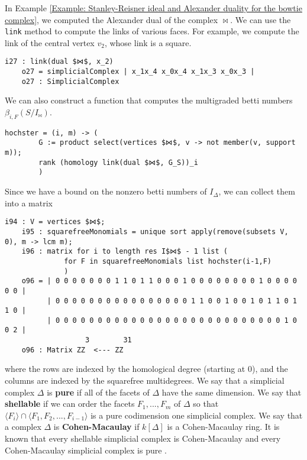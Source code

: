 \documentclass[12pt,leqno]{amsart}
\theoremstyle{definition}
\newenvironment{example}
{\pushQED{\qed}\renewcommand{\qedsymbol}{$\diamond$}\examplex}
{\popQED\endexamplex}
\begin{document}
\begin{example}
  In Example \ref{Example: Stanley-Reisner ideal and Alexander duality for the bowtie complex}, we computed the Alexander dual of the complex $\bowtie$. We can use the \texttt{link} method to compute the links of various faces. For example, we compute the link of the central vertex $v_2$, whose link is a square.
\begin{lstlisting}[basicstyle={\ttfamily \scriptsize}, xleftmargin=-23pt]
    i27 : link(dual $⋈$, x_2)
    o27 = simplicialComplex | x_1x_4 x_0x_4 x_1x_3 x_0x_3 |
    o27 : SimplicialComplex
\end{lstlisting}
  We can also construct a function that computes the multigraded betti numbers $\beta_{i,F}(S/I_{\bowtie})$.
\begin{lstlisting}[basicstyle={\ttfamily \scriptsize}, xleftmargin=-23pt]
    hochster = (i, m) -> (
        G := product select(vertices $⋈$, v -> not member(v, support m));
        rank (homology link(dual $⋈$, G_S))_i
        )
\end{lstlisting}
  Since we have a bound on the nonzero betti numbers of $I_\Delta$, we can collect them into a matrix
\begin{lstlisting}[basicstyle={\ttfamily \scriptsize}, xleftmargin=-23pt]
    i94 : V = vertices $⋈$;
    i95 : squarefreeMonomials = unique sort apply(remove(subsets V, 0), m -> lcm m);
    i96 : matrix for i to length res I$⋈$ - 1 list (
              for F in squarefreeMonomials list hochster(i-1,F)
              )
    o96 = | 0 0 0 0 0 0 0 1 1 0 1 1 0 0 0 1 0 0 0 0 0 0 0 0 1 0 0 0 0 0 0 |
          | 0 0 0 0 0 0 0 0 0 0 0 0 0 0 0 0 1 1 0 0 1 0 0 1 0 1 1 0 1 1 0 |
          | 0 0 0 0 0 0 0 0 0 0 0 0 0 0 0 0 0 0 0 0 0 0 0 0 0 0 0 1 0 0 2 |
                   3        31
    o96 : Matrix ZZ  <--- ZZ
\end{lstlisting}
  where the rows are indexed by the homological degree (starting at $0$), and the columns are indexed by the squarefree multidegrees.
\end{example}
% 
We say that a simplicial complex $\Delta$ is \textbf{pure} if all of the facets of $\Delta$ have the same dimension. We say that \textbf{shellable} if we can order the facets $F_1,...,F_m$ of $\Delta$ so that $\langle F_i \rangle \cap \langle F_1,F_2,...,F_{i-1} \rangle$ is a pure codimension one simplicial complex. We say that a complex $\Delta$ is \textbf{Cohen-Macaulay} if $k[\Delta]$ is a Cohen-Macaulay ring. It is known that every shellable simplicial complex is Cohen-Macaulay \cite[Theorem 5.1.13]{BH} and every Cohen-Macaulay simplicial complex is pure \cite[Corollary 5.1.5]{BH}.
\end{document}

